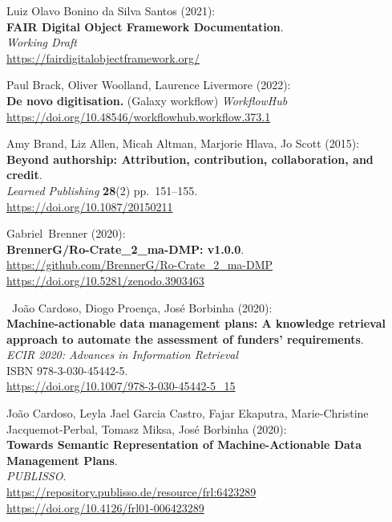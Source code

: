 \begin{thebibliography}{9}
 Luiz Olavo Bonino da Silva Santos (2021):\\
\textbf{FAIR Digital Object Framework Documentation}.\\
\emph{Working Draft}\\
\url{https://fairdigitalobjectframework.org/}

 Paul Brack, Oliver Woolland, Laurence Livermore
(2022):\\
\textbf{De novo digitisation.} (Galaxy workflow) \emph{WorkflowHub}\\
\url{https://doi.org/10.48546/workflowhub.workflow.373.1}

 Amy Brand, Liz Allen, Micah Altman, Marjorie Hlava, Jo Scott
(2015):\\
\textbf{Beyond authorship: Attribution, contribution, collaboration, and
credit}.\\
\emph{Learned Publishing} \textbf{28}(2) pp.~151--155.\\
\url{https://doi.org/10.1087/20150211}

 Gabriel~Brenner (2020):\\
\textbf{BrennerG/Ro-Crate\_2\_ma-DMP: v1.0.0}.\\
\url{https://github.com/BrennerG/Ro-Crate_2_ma-DMP}~\\
\url{https://doi.org/10.5281/zenodo.3903463}

~João Cardoso, Diogo Proença, José Borbinha (2020):\\
\textbf{Machine-actionable data management plans: A knowledge retrieval
approach to automate the assessment of funders' requirements}.\\
\emph{ECIR 2020: Advances in Information Retrieval}\\
ISBN 978-3-030-45442-5.\\
\url{https://doi.org/10.1007/978-3-030-45442-5_15}


 João Cardoso, Leyla Jael Garcia Castro, Fajar Ekaputra, Marie-Christine Jacquemot-Perbal, Tomasz Miksa, José Borbinha (2020):\\
\textbf{Towards Semantic Representation of Machine-Actionable Data
Management Plans}.\\
\emph{PUBLISSO}.\\
\url{https://repository.publisso.de/resource/frl:6423289}~\\
\url{https://doi.org/10.4126/frl01-006423289}


\end{thebibliography}
